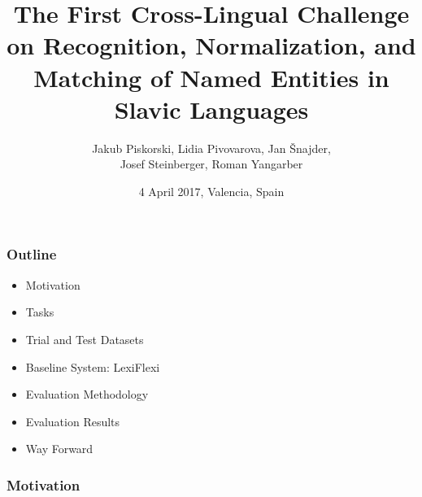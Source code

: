 \documentclass{beamer}
\title[Cross-lingual NER Challenge]{\textbf{The First Cross-Lingual Challenge on Recognition, Normalization,
and Matching of Named Entities in Slavic Languages}}
\author[J. Piskorski et. al]{Jakub Piskorski, Lidia Pivovarova, Jan Šnajder,\\ Josef Steinberger, Roman Yangarber\\}
\date{{\color{white} 4 April 2017, Valencia, Spain}}
\begin{document}
\maketitle

%



\begin{frame}
 \frametitle{Outline}

\begin{itemize}
\item Motivation
\item Tasks
\item Trial and Test Datasets
\item Baseline System: LexiFlexi
\item Evaluation Methodology
\item Evaluation Results
\item Way Forward
\end{itemize}


\end{frame}

\begin{frame}
 \frametitle{Motivation}

\end{frame}
\end{document}
